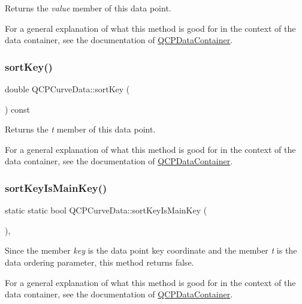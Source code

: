 Returns the {\itshape value} member of this data point.

For a general explanation of what this method is good for in the context of the data container, see the documentation of \mbox{\hyperlink{class_q_c_p_data_container}{Q\+C\+P\+Data\+Container}}. \mbox{\label{class_q_c_p_curve_data_a583174f2b68e01b4d545f04571f58bd0}} 
\subsubsection{\texorpdfstring{sort\+Key()}{sortKey()}}
{\footnotesize\ttfamily double Q\+C\+P\+Curve\+Data\+::sort\+Key (\begin{DoxyParamCaption}{ }\end{DoxyParamCaption}) const\hspace{0.3cm}{\ttfamily [inline]}}

Returns the {\itshape t} member of this data point.

For a general explanation of what this method is good for in the context of the data container, see the documentation of \mbox{\hyperlink{class_q_c_p_data_container}{Q\+C\+P\+Data\+Container}}. \mbox{\label{class_q_c_p_curve_data_a1b78f228e31ca40a1e69add44537918c}} 
\subsubsection{\texorpdfstring{sort\+Key\+Is\+Main\+Key()}{sortKeyIsMainKey()}}
{\footnotesize\ttfamily static static bool Q\+C\+P\+Curve\+Data\+::sort\+Key\+Is\+Main\+Key (\begin{DoxyParamCaption}{ }\end{DoxyParamCaption})\hspace{0.3cm}{\ttfamily [inline]}, {\ttfamily [static]}}

Since the member {\itshape key} is the data point key coordinate and the member {\itshape t} is the data ordering parameter, this method returns false.

For a general explanation of what this method is good for in the context of the data container, see the documentation of \mbox{\hyperlink{class_q_c_p_data_container}{Q\+C\+P\+Data\+Container}}. \mbox{\label{class_q_c_p_curve_data_acf15deffd18d400651f8384a95dad9f8}} 
